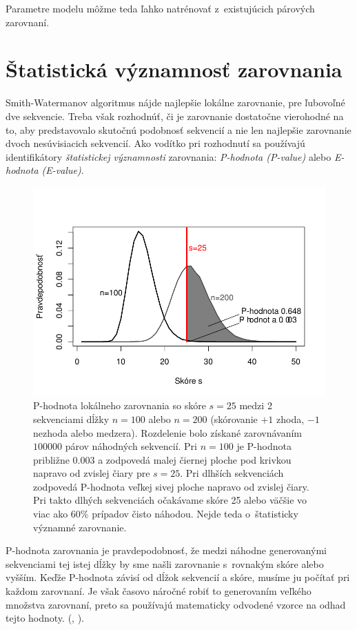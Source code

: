 Parametre modelu môžme teda ľahko natrénovať z~existujúcich párových zarovnaní.

\section[Štat. významnosť ]{Štatistická významnosť zarovnania}
Smith-Watermanov algoritmus nájde najlepšie lokálne zarovnanie, pre ľubovoľné dve sekvencie. Treba však rozhodnúť, či je zarovnanie dostatočne vierohodné na to, aby predstavovalo skutočnú podobnosť sekvencií a nie len najlepšie zarovnanie dvoch nesúvisiacich sekvencií.
Ako vodítko pri rozhodnutí sa používajú identifikátory \textit{štatistickej významnosti} zarovnania: \textit{P-hodnota (P-value)} alebo \textit{E-hodnota (E-value)}.

\begin{figure}[htp]
    \centering
    \includegraphics[width=.9\textwidth]{images/p-value}
    \caption[P-hodnota lokálneho zarovnania]{P-hodnota lokálneho zarovnania so skóre $s = 25$ medzi 2 sekvenciami dĺžky $n = 100$ alebo $n = 200$ (skórovanie $+1$ zhoda, $-1$ nezhoda alebo medzera). Rozdelenie bolo získané zarovnávaním $100000$ párov náhodných sekvencií. Pri $n=100$ je P-hodnota približne 0.003 a zodpovedá malej čiernej ploche pod krivkou napravo od zvislej čiary pre $s=25$. Pri dlhších sekvenciách zodpovedá P-hodnota veľkej sivej ploche napravo od zvislej čiary. Pri takto dlhých sekvenciách očakávame skóre 25 alebo väčšie vo viac ako 60\% prípadov čisto náhodou. Nejde teda o~štatisticky významné zarovnanie.}
    \label{fig:p-value}
\end{figure}

P-hodnota zarovnania je pravdepodobnosť, že medzi náhodne generovanými sekvenciami tej istej dĺžky by sme našli zarovnanie s~rovnakým skóre alebo vyšším. Keďže P-hodnota závisí od dĺžok sekvencií a skóre, musíme ju počítať pri každom zarovnaní. Je však časovo náročné robiť to generovaním veľkého množstva zarovnaní, preto sa používajú matematicky odvodené vzorce na odhad tejto hodnoty. (\cite{Karlin}, \cite{Mitrophanov}).

